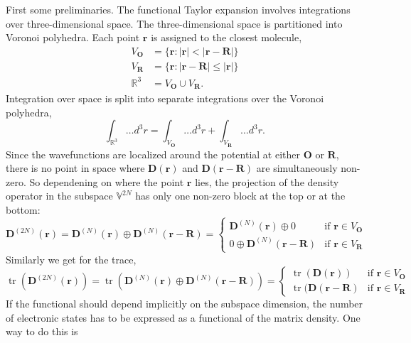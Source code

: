 \documentclass[journal=jpca,manuscript=article,layout=singlecolumn]{achemso}
\DeclareMathOperator{\tr}{tr}
\newcommand\m[1]{\mathbf{#1}}
\renewcommand\vec[1]{\mathbf{#1}}
\begin{document}
First some preliminaries.
The functional Taylor expansion involves integrations over three-dimensional space.
The three-dimensional space is partitioned into Voronoi polyhedra. Each point $\vec{r}$ is assigned to the closest molecule,
\begin{align}
  V_{\vec{O}} &= \{\vec{r}: \vert \vec{r} \vert < \vert \vec{r} - \vec{R} \vert \} \\
  V_{\vec{R}} &= \{\vec{r}: \vert \vec{r} - \vec{R} \vert \leq \vert \vec{r} \vert \} \\
  \mathbb{R}^3 &= V_{\vec{O}} \cup V_{\vec{R}}.
\end{align}
Integration over space is split into separate integrations over the Voronoi polyhedra,
\begin{equation}
 \int_{\mathbb{R}^3} \ldots d^3\!r = \int_{V_{\vec{O}}} \ldots d^3\!r + \int_{V_{\vec{R}}} \ldots d^3\!r.
\end{equation}
Since the wavefunctions are localized around the potential at either $\vec{O}$ or $\vec{R}$, there is no point in space where $\m{D}(\vec{r})$ and $\m{D}(\vec{r}-\vec{R})$ are simultaneously non-zero. So dependening on where the point $\vec{r}$ lies, the projection of the density operator in the subspace $\mathbb{V}^{2N}$ has only one non-zero block at the top or at the bottom:
\begin{equation}
  \m{D}^{(2N)}(\vec{r}) = \m{D}^{(N)}(\vec{r}) \oplus \m{D}^{(N)}(\vec{r}-\vec{R}) =
  \begin{cases}
    \m{D}^{(N)}(\vec{r}) \oplus 0 & \text{if } \vec{r} \in V_{\vec{O}} \\
    0 \oplus \m{D}^{(N)}(\vec{r}-\vec{R}) & \text{if } \vec{r} \in V_{\vec{R}} \label{eqn:D_split}
  \end{cases}
\end{equation}
Similarly we get for the trace,
\begin{equation}
  \tr\left(\m{D}^{(2N)}(\vec{r}) \right)
  =
  \tr\left(\m{D}^{(N)}(\vec{r}) \oplus \m{D}^{(N)}(\vec{r}-\vec{R}) \right)
  =
  \begin{cases}
    \tr(\m{D}(\vec{r})) & \text{if } \vec{r} \in V_{\vec{O}} \\
    \tr(\m{D}(\vec{r}-\vec{R}) & \text{if } \vec{r} \in V_{\vec{R}} \label{eqn:tr_split}
  \end{cases}
\end{equation}
If the functional should depend implicitly on the subspace dimension, the number of electronic states has to be expressed as a functional of the matrix density. One way to do this is
\end{document}
